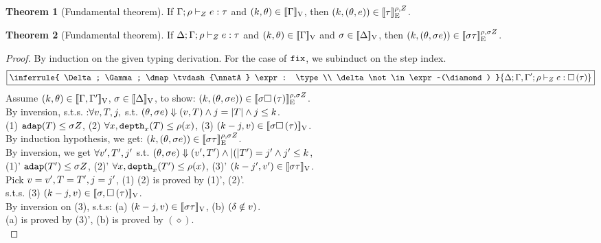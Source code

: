 \documentclass[a4paper,11pt]{article}
\theoremstyle{definition}
\newtheorem{thm}{Theorem}
\begin{document}
\begin{thm}[Fundamental theorem]
  If $\Gamma; \rho \vdash_{Z} e: \tau$ and $(k, \theta)
  \in [\![ \Gamma ]\!]_{\text{V}}$, then $(k, (\theta, e)) \in
  [\![ \tau ]\!]_{\text{E}}^{\rho, Z}$.
\end{thm}
{\color{red}
\begin{thm}[Fundamental theorem]
  If $\Delta; \Gamma; \rho \vdash_{Z} e: \tau$ and $(k, \theta)
  \in [\![ \Gamma ]\!]_{\text{V}}$ and $ \sigma \in [\![ \Delta ]\!]_{\text{V}}$, then $(k, (\theta, \sigma e)) \in
  [\![ \sigma \tau ]\!]_{\text{E}}^{\rho, \sigma Z}$.
\end{thm}%
}
\begin{proof}
By induction on the given typing derivation. For the case of
$\mathop{\mathtt{fix}}$, we subinduct on the step index.\\

\[
    \boxed{
     \inferrule{
      \Delta; \Gamma; \dmap \tvdash{\nnatA} \expr: \type \\
      \delta \not\in \expr~(\diamond)
    }{
      \Delta; \Gamma, \Gamma'; \dmap \tvdash{\nnatA} \expr: \tbox{\type}
    }    
    }
\]
Assume $(k, \theta) \in [\![ \Gamma, \Gamma' ]\!]_{\text{V}}$, $\sigma \in [\![ \Delta ]\!]_{\text{V}}$, to show: $(k, (\theta, \sigma e)) \in [\![ \sigma \mathtt{\square} \, (\tau) ]\!]_{\text{E}}^{\rho, \sigma Z}$.\\
%
By inversion, s.t.s. :$ \forall v, T, j, 
$ s.t. $ (\theta, \sigma e) \mathrel{\Downarrow} (v, T) \land j = |T| \land j \leq k $.  \\
(1) $\mathtt{adap}(T) \leq \sigma Z $, (2) $\forall x, \mathtt{depth}_{x}(T) \leq \rho(x)$, (3) $(k-j, v) \in [\![  \sigma \mathtt{\square} \, (\tau)  ]\!]_{\text{V}} $. \\
%
By induction hypothesis, we get: $(k, (\theta, \sigma e)) \in [\![ \sigma \tau ]\!]_{\text{E}}^{\rho, \sigma Z}$.\\
%
By inversion, we get $\forall v', T', j'$ s.t. $(\theta, \sigma e) \mathrel{\Downarrow} (v', T') \land |(|T') = j' \land j' \leq k$,\\
(1)' $\mathtt{adap}(T') \leq \sigma Z$, (2)' $\forall x, \mathtt{depth}_{x}(T') \leq \rho(x)$, (3)' $(k - j', v') \in [\![ \sigma \tau ]\!]_{\text{V}}$.\\
%
Pick $v = v', T = T' , j = j'$, (1) (2) is proved by (1)', (2)'.\\
%
s.t.s. (3) $(k - j, v ) \in [\![ \sigma, \mathtt{\square} \, (\tau) ]\!]_{\text{V}}$.\\
%
By inversion on (3), s.t.s: (a) $(k - j, v) \in [\![ \sigma \tau ]\!]_{\text{V}}$, (b) $(\delta \notin v)$.\\
(a) is proved by (3)', (b) is proved by $(\diamond)$.
\\


\end{proof}
\end{document}
